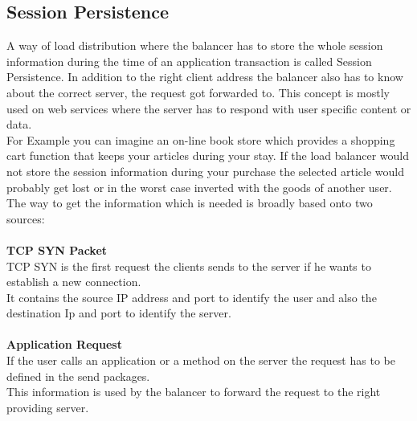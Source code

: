 \documentclass[12p]{article}
\begin{document}
	\subsection{Session Persistence}
	A way of load distribution where the balancer has to store the whole session information during the time of an application transaction is called Session Persistence. In addition to the right client address the balancer also has to know about the correct server, the request got forwarded to. This concept is mostly used on web services where the server has to respond with user specific content or data.\\
	For Example you can imagine an on-line book store which provides a shopping cart function that keeps your articles during your stay. If the load balancer would not store the session information during your purchase the selected article would probably get lost or in the worst case inverted with the goods of another user.\\
	The way to get the information which is needed is broadly based onto two sources:\\
	\\
	\textbf{TCP SYN Packet}\\
	TCP SYN is the first request the clients sends to the server if he wants to establish a new connection.\\
	It contains the source IP address and port to identify the user and also the destination Ip and port to identify the server.\\
	\\
	\textbf{Application Request}\\
	If the user calls an application or a method on the server the request has to be defined in the send packages.\\
	This information is used by the balancer to forward the request to the right providing server.
	
\end{document}
